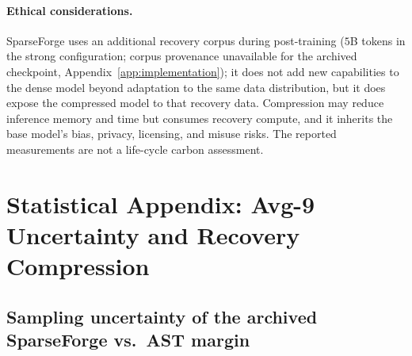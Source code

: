 \documentclass{article}
\begin{document}
\paragraph{Ethical considerations.}
SparseForge uses an additional recovery corpus during post-training ($5$B tokens in the strong configuration; corpus provenance unavailable for the archived checkpoint, Appendix~\ref{app:implementation}); it does not add new capabilities to the dense model beyond adaptation to the same data distribution, but it does expose the compressed model to that recovery data. Compression may reduce inference memory and time but consumes recovery compute, and it inherits the base model's bias, privacy, licensing, and misuse risks. The reported measurements are not a life-cycle carbon assessment.

\label{p5:main-text-end}



\appendix
\setlength{\intextsep}{6pt plus 2pt minus 2pt}
\setlength{\abovecaptionskip}{4pt}
\section{Statistical Appendix: Avg-9 Uncertainty and Recovery Compression}
\label{app:stats}

\subsection{Sampling uncertainty of the archived SparseForge vs.\ AST margin}
\label{app:sf-ast-stats}
\end{document}
